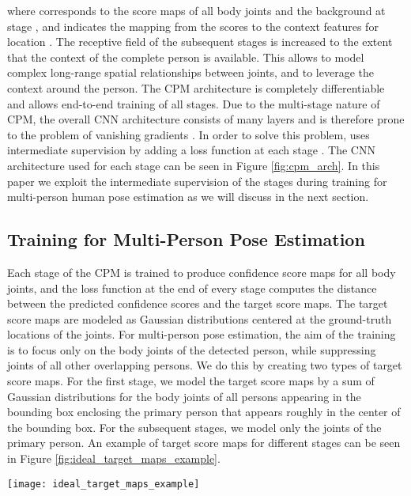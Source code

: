 \documentclass[runningheads]{llncs}
\begin{document}
where  corresponds to the score maps of all body joints and the background at stage , and  indicates the mapping from the scores   to the context features for location . The receptive field of the subsequent stages is increased to the extent that the context of the complete person is available. This allows to model complex long-range spatial relationships between joints, and to leverage the context around the person. The CPM architecture is completely differentiable and allows end-to-end training of all stages. Due to the multi-stage nature of CPM, the overall CNN architecture consists of many layers and is therefore prone to the problem of vanishing gradients \cite{bengio1994learning, glorot2010understanding, wei2016convolutional}. In order to solve this problem, \cite{wei2016convolutional} uses intermediate supervision by adding a loss function at each stage . The CNN architecture used for each stage can be seen in Figure \ref{fig:cpm_arch}. In this paper we exploit the intermediate supervision of the stages during training for multi-person human pose estimation as we will discuss in the next section. 
 
\subsection{Training for Multi-Person Pose Estimation}

Each stage of the CPM is trained to produce confidence score maps for all body joints, and the loss function at the end of every stage computes the  distance between the predicted confidence scores and the target score maps. The target score maps are modeled as Gaussian distributions centered at the ground-truth locations of the joints. 
For multi-person pose estimation, the aim of the training is to focus only on the body joints of the detected person, while suppressing joints of all other overlapping persons. We do this by creating two types of target score maps. For the first stage, we model the target score maps by a sum of Gaussian distributions for the body joints of all persons appearing in the bounding box enclosing the primary person that appears roughly in the center of the bounding box. For the subsequent stages, we model only the joints of the primary person. 
An example of target score maps for different stages can be seen in Figure \ref{fig:ideal_target_maps_example}. 

\begin{figure*}[t!]
\centering
\captionsetup[figure]{skip=0pt}
\texttt{[image: ideal\_target\_maps\_example]}
\caption{Example of target score maps for the head, neck and left shoulder. The target score maps for the first stage include the joints of all persons (left). The target score maps for all subsequent stages only include the joints of the primary person.}
\label{fig:ideal_target_maps_example}
\end{figure*}
\end{document}
